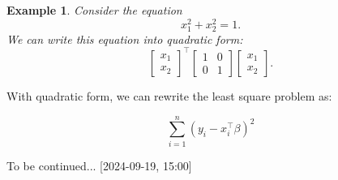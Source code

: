\documentclass{article}
\theoremstyle{MyNonumberplain}
\theoremstyle{break}
\theoremstyle{break}
\newtheorem{example}{Example}[section]
\theoremstyle{break}
\theoremstyle{break}
\begin{document}
\begin{expbox}
    \begin{example}
        Consider the equation
        $$x_1^2+x_2^2=1.$$
        We can write this equation into quadratic form:
        $$\begin{bmatrix}
            x_1\\
            x_2
        \end{bmatrix}^\intercal
       \begin{bmatrix}
            1 & 0\\
            0 & 1
        \end{bmatrix}
        \begin{bmatrix}
            x_1\\
            x_2
        \end{bmatrix}.
        $$
    \end{example}
\end{expbox}

With quadratic form, we can rewrite the least square problem as:

$$\sum_{i=1}^n (y_i-x_i^\intercal\beta)^2$$

To be continued... [2024-09-19, 15:00]
\end{document}
